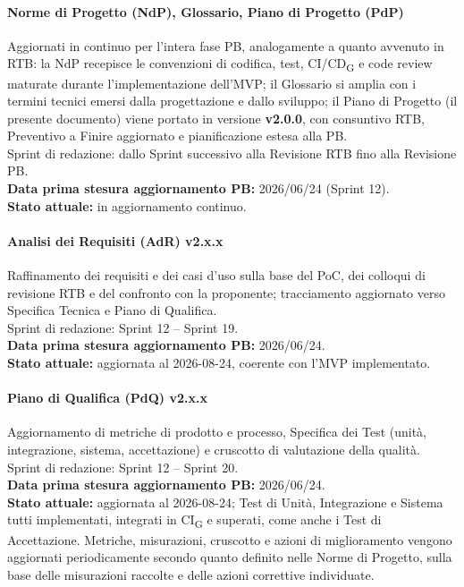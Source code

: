 \paragraph{Norme di Progetto (NdP), Glossario, Piano di Progetto (PdP)}
Aggiornati in continuo per l'intera fase PB, analogamente a quanto avvenuto in
RTB: la NdP recepisce le convenzioni di codifica, test, CI/CD\textsubscript{G} e
code review maturate durante l'implementazione dell'MVP; il Glossario si
amplia con i termini tecnici emersi dalla progettazione e dallo sviluppo; il
Piano di Progetto (il presente documento) viene portato in versione
\textbf{v2.0.0}, con consuntivo RTB, Preventivo a Finire aggiornato e
pianificazione estesa alla PB.\\
Sprint di redazione: dallo Sprint successivo alla Revisione RTB fino alla
Revisione PB.\\
\textbf{Data prima stesura aggiornamento PB:} 2026/06/24 (Sprint 12).\\
\textbf{Stato attuale:} in aggiornamento continuo.

\paragraph{Analisi dei Requisiti (AdR) v2.x.x}
Raffinamento dei requisiti e dei casi d'uso sulla base del PoC, dei colloqui di revisione
RTB e del confronto con la proponente; tracciamento aggiornato verso Specifica
Tecnica e Piano di Qualifica.\\
Sprint di redazione: Sprint 12 -- Sprint 19.\\
\textbf{Data prima stesura aggiornamento PB:} 2026/06/24.\\
\textbf{Stato attuale:} aggiornata al 2026-08-24, coerente con l'MVP
implementato.

\paragraph{Piano di Qualifica (PdQ) v2.x.x}
Aggiornamento di metriche di prodotto e processo, Specifica dei Test (unità,
integrazione, sistema, accettazione) e cruscotto di valutazione della
qualità.\\
Sprint di redazione: Sprint 12 -- Sprint 20.\\
\textbf{Data prima stesura aggiornamento PB:} 2026/06/24.\\
\textbf{Stato attuale:} aggiornata al 2026-08-24; Test di Unità, Integrazione
e Sistema tutti implementati, integrati in CI\textsubscript{G} e superati, come anche i 
Test di Accettazione. Metriche, misurazioni, cruscotto e azioni di miglioramento vengono aggiornati
periodicamente secondo quanto definito nelle Norme di Progetto, sulla base
delle misurazioni raccolte e delle azioni correttive individuate.

